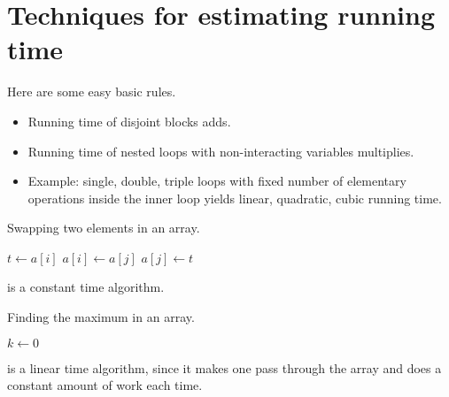 \chapter{Techniques for estimating running time}

Here are some easy basic rules.
\begin{itemize}
\item Running time of disjoint blocks adds.
\item Running time of nested  loops with non-interacting variables multiplies.
\item Example: single, double, triple loops with fixed number of elementary operations inside the inner loop yields linear, quadratic, cubic running time.
\end{itemize}




\begin{algorithm}[H]
  \caption{Swapping two elements in an array.
    \label{alg:swap}}
\begin{algorithmic}[0]
	\State $t \gets a[i]$
	\State $a[i] \gets a[j]$
	\State $a[j] \gets t$
	\State {}
\EndFunction
\end{algorithmic}
\end{algorithm}
 is a constant time algorithm.


\begin{algorithm}[H]
  \caption{Finding the maximum in an array.
    \label{alg:findmax}}
\begin{algorithmic}[0]
	\State $k \gets 0$ 
		\EndIf
	\EndFor
	\State {}
\EndFunction
\end{algorithmic}
\end{algorithm}
 is a linear time algorithm, since it makes one pass through the array and does a constant amount of work each time.

